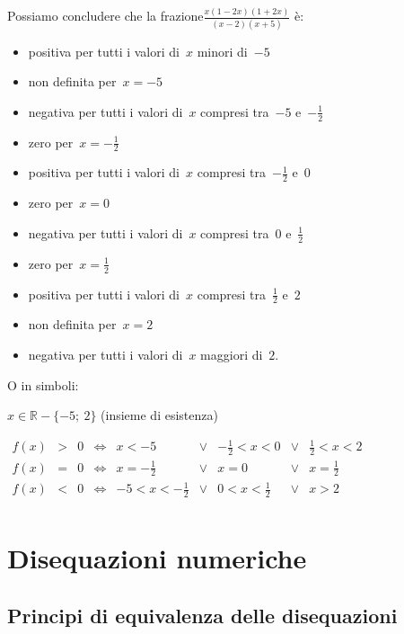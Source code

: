Possiamo concludere che la frazione$\frac{x(1 -2 x)(1 + 2 x)}{(x -2)(x +5)}$ 
è:

\begin{itemize}
 \item positiva per tutti i valori di~$x$ minori di~$-5$
 \item non definita per~$x=-5$
 \item negativa per tutti i valori di~$x$ compresi tra~$-5$ e~$-\frac{1}{2}$
 \item zero per~$x=-\frac{1}{2}$
 \item positiva per tutti i valori di~$x$ compresi tra~$-\frac{1}{2}$ e~$0$
 \item zero per~$x=0$
 \item negativa per tutti i valori di~$x$ compresi tra~$0$ e~$\frac{1}{2}$
 \item zero per~$x=\frac{1}{2}$
 \item positiva per tutti i valori di~$x$ compresi tra~$\frac{1}{2}$ e~$2$
 \item non definita per~$x=2$
 \item negativa per tutti i valori di~$x$ maggiori di~$2$.
\end{itemize}

O in simboli:

$x \in \mathbb{R} - \{ -5;~2 \}$ (insieme di esistenza)

$\begin{array}{cccccccccc}
f(x) & > & 0 & \Leftrightarrow &
 x < -5 & \lor & -\frac{1}{2} < x < 0 & \lor & \frac{1}{2} < x < 2 \\
 
f(x) & = & 0 & \Leftrightarrow &
 x = -\frac{1}{2} & \lor & x = 0 & \lor & x = \frac{1}{2} \\
 
f(x) & < & 0 & \Leftrightarrow &
 -5 < x < -\frac{1}{2} & \lor & 0 < x < \frac{1}{2} & \lor & x > 2 \\
\end{array}$

\section{Disequazioni numeriche}
\label{sec:dis_numeriche}

\subsection{Principi di equivalenza delle disequazioni}

